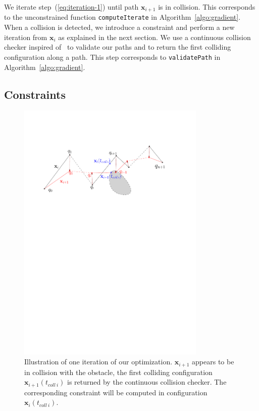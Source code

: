 \documentclass{tADR2e}
\newcommand\xx{\mathbf{x}}
\newcommand\tcolli{t_{coll\ i}}
\begin{document}
We iterate step~(\ref{eq:iteration-1}) until path $\xx_{i+1}$ is in collision. This 
corresponds to the unconstrained function \texttt{computeIterate} in 
Algorithm~\ref{algo:gradient}.
When a collision is detected, we introduce a constraint and perform a new 
iteration from $\xx_i$ as explained in the next section. We use a continuous 
collision checker inspired of~\cite{SchwarzerExactCollision} to validate our 
paths and to return the first colliding configuration along a path. This step corresponds to \texttt{validatePath} in Algorithm~\ref{algo:gradient}.

\subsection{Constraints}

\begin{figure}[t]
	\centering
	\includegraphics[width=9cm]{optim_grad.pdf}
	\caption{Illustration of one iteration of our optimization. $\xx_{i+1}$ 
	appears 
	to be in collision with the obstacle, the first colliding configuration 
	$\xx_{i+1}(\tcolli)$ is returned by the continuous collision checker. The corresponding constraint will be computed in configuration $\xx_{i}(\tcolli)$.}
	\label{optim_grad}
\end{figure}
\end{document}

